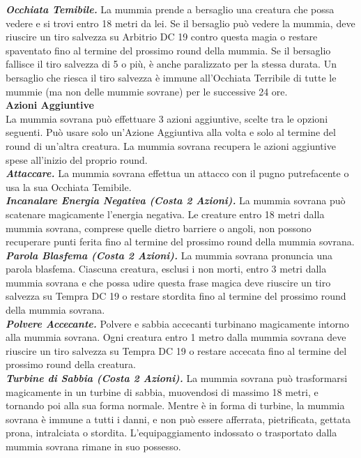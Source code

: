 \begin{multicols}{2}
\emph{\textbf{Occhiata Temibile.}} La mummia prende a bersaglio una creatura che possa vedere e si trovi entro 18 metri da lei. Se il bersaglio può vedere la mummia, deve riuscire un tiro salvezza su Arbitrio DC  19 contro questa magia o restare spaventato fino al termine del prossimo round della mummia. Se il bersaglio fallisce il tiro salvezza di 5 o più, è anche paralizzato per la stessa durata. Un bersaglio che riesca il tiro salvezza è immune all'Occhiata Terribile di tutte le mummie (ma non delle mummie sovrane) per le successive 24 ore.\\

\textbf{Azioni Aggiuntive}\\

La mummia sovrana può effettuare 3 azioni aggiuntive, scelte tra le opzioni seguenti. Può usare solo un'Azione Aggiuntiva alla volta e solo al termine del round di un'altra creatura. La mummia sovrana recupera le azioni aggiuntive spese all'inizio del proprio round.\\

\emph{\textbf{Attaccare.}} La mummia sovrana effettua un attacco con il pugno putrefacente o usa la sua Occhiata Temibile.\\

\emph{\textbf{Incanalare Energia Negativa (Costa 2 Azioni).}} La mummia sovrana può scatenare magicamente l'energia negativa. Le creature entro 18 metri dalla mummia sovrana, comprese quelle dietro barriere o angoli, non possono recuperare punti ferita fino al termine del prossimo round della mummia sovrana.\\

\emph{\textbf{Parola Blasfema (Costa 2 Azioni).}} La mummia sovrana pronuncia una parola blasfema. Ciascuna creatura, esclusi i non morti, entro 3 metri dalla mummia sovrana e che possa udire questa frase magica deve riuscire un tiro salvezza su Tempra DC  19 o restare stordita fino al termine del prossimo round della mummia sovrana.\\

\emph{\textbf{Polvere Accecante.}} Polvere e sabbia accecanti turbinano magicamente intorno alla mummia sovrana. Ogni creatura entro 1 metro dalla mummia sovrana deve riuscire un tiro salvezza su Tempra DC  19 o restare accecata fino al termine del prossimo round della creatura.\\

\emph{\textbf{Turbine di Sabbia (Costa 2 Azioni).}} La mummia sovrana può trasformarsi magicamente in un turbine di sabbia, muovendosi di massimo 18 metri, e tornando poi alla sua forma normale. Mentre è in forma di turbine, la mummia sovrana è immune a tutti i danni, e non può essere afferrata, pietrificata, gettata prona, intralciata o stordita. L'equipaggiamento indossato o trasportato dalla mummia sovrana rimane in suo possesso.\\


\end{multicols}
